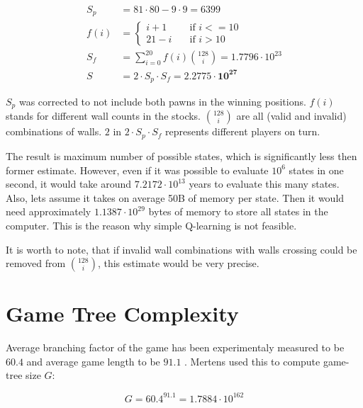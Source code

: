 \begin{center}
  \vspace*{-1.30cm}
  \begin{equation}
    \label{eqn:myestimate}
    \begin{aligned}
      S_p &= 81 {\cdot} 80 - 9 {\cdot} 9 = 6399\\[-0.20cm]
      f(i)\!&=\! \begin{cases}
        i + 1  & \quad \text{if } i <= 10 \\[-0.30cm]
        21 - i & \quad \text{if } i > 10
      \end{cases}\\
      S_f\! &=\! \sum_{i=0}^{20} f(i){128 \choose i} = 1.7796 {\cdot} 10^{23}
      \\
      S &= 2 {\cdot} S_p {\cdot} S_f = \mathbf{2.2775{\cdot}10^{27}}
    \end{aligned}
  \end{equation}
  \vspace*{-1.15cm}
\end{center}

$S_p$ was corrected to not include both pawns in the winning positions.
$f(i)$ %
stands for different wall counts in the stocks.
${128 \choose i}$ are all (valid and invalid) combinations of walls.
$2$ in $2{\cdot} S_p {\cdot} S_f$ represents different players on turn.

The result is maximum number of possible states, which is significantly
less then former estimate. However, even if it was possible to evaluate $10^{6}$
states in one second, it would take around $7.2172{\cdot}10^{13}$ years to
evaluate this many states. Also, lets assume it takes on average 50B
of memory per state. Then it would need approximately
$1.1387{\cdot}10^{29}$ bytes of memory to store all states in the
computer. This is the reason why simple Q-learning is not feasible.

It is worth to note, that if invalid wall combinations with walls crossing
could be removed from ${128 \choose i}$, this estimate would be very precise.

\section{Game Tree Complexity}
Average branching factor of the game has been experimentaly measured to be
$60.4$ and average game length to be $91.1$ \cite{glendenning}.
Mertens \cite{mertens} used this to compute game-tree size $G$:
\begin{center}
  \vspace*{-1.30cm}
  \begin{equation}
    \label{eqn:mgtc}
    G = 60.4^{91.1} = 1.7884{\cdot}10^{162}
  \end{equation}
  \vspace*{-1.30cm}
\end{center}

